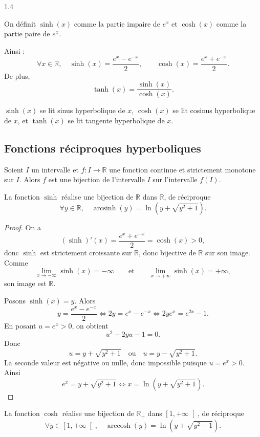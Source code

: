 \documentclass{article}
\DeclareMathOperator{\arccosh}{arccosh}
\DeclareMathOperator{\arcsinh}{arcsinh}
\begin{document}
\begin{spacing}{1.4}
\begin{tcolorbox}[colframe=blue!75!black,colback=blue!5!white,title=Fonctions hyperboliques]
On définit $\sinh(x)$ comme la partie impaire de $e^x$ et $\cosh(x)$ comme la partie paire de $e^x$.

Ainsi :
\[
\forall x\in \mathbb{R}, \quad
\sinh(x)=\frac{e^x-e^{-x}}{2},
\qquad
\cosh(x)=\frac{e^x+e^{-x}}{2}.
\]
De plus,
\[
\tanh(x)=\frac{\sinh(x)}{\cosh(x)}.
\]
\end{tcolorbox}

$\sinh(x)$ se lit sinus hyperbolique de $x$, $\cosh(x)$ se lit cosinus hyperbolique de $x$, et $\tanh(x)$ se lit tangente hyperbolique de $x$.

\subsection{Fonctions réciproques hyperboliques}

\begin{tcolorbox}[colframe=blue!75!black,colback=blue!5!white,title=Théorème de la bijection]
Soient $I$ un intervalle et $f : I \rightarrow \mathbb{R}$ une fonction continue et strictement monotone sur $I$.
Alors $f$ est une bijection de l’intervalle $I$ sur l’intervalle $f(I)$.
\end{tcolorbox}

\begin{tcolorbox}[colframe=blue!75!black,colback=blue!5!white,title=Fonction réciproque de $\sinh$]
La fonction $\sinh$ réalise une bijection de $\mathbb{R}$ dans $\mathbb{R}$, de réciproque
\[
\forall y \in \mathbb{R},\quad
\arcsinh(y)=\ln \left( y+\sqrt{y^2+1}\right).
\]
\end{tcolorbox}

\begin{proof}
On a
\[
(\sinh)'(x)=\frac{e^x+e^{-x}}{2}=\cosh(x)>0,
\]
donc $\sinh$ est strictement croissante sur $\mathbb{R}$, donc bijective de $\mathbb{R}$ sur son image. Comme
\[
\lim_{x\to -\infty}\sinh(x)=-\infty
\qquad\text{et}\qquad
\lim_{x\to +\infty}\sinh(x)=+\infty,
\]
son image est $\mathbb{R}$.

Posons $\sinh(x)=y$. Alors
\[
y=\frac{e^x-e^{-x}}{2}
\iff 2y=e^x-e^{-x}
\iff 2ye^x=e^{2x}-1.
\]
En posant $u=e^x>0$, on obtient
\[
u^2-2yu-1=0.
\]
Donc
\[
u=y+\sqrt{y^2+1}
\quad\text{ou}\quad
u=y-\sqrt{y^2+1}.
\]
La seconde valeur est négative ou nulle, donc impossible puisque $u=e^x>0$. Ainsi
\[
e^x=y+\sqrt{y^2+1}
\iff
x=\ln\left(y+\sqrt{y^2+1}\right).
\]
\end{proof}

\begin{tcolorbox}[colframe=blue!75!black,colback=blue!5!white,title=Fonction réciproque de $\cosh$]
La fonction $\cosh$ réalise une bijection de $\mathbb{R}_+$ dans $\left[1,+\infty\right[$, de réciproque
\[
\forall y \in \left[1,+\infty\right[,\quad
\arccosh(y)=\ln \left( y+\sqrt{y^2-1}\right).
\]
\end{tcolorbox}


\end{spacing}
\end{document}
